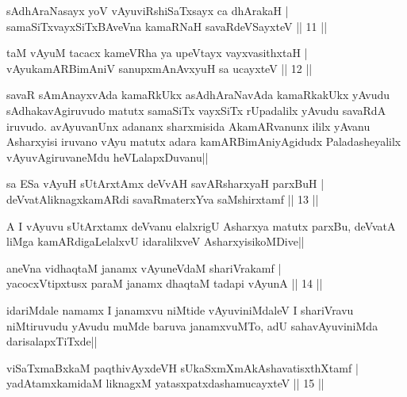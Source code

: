 \begin{shl}
sAdhAraNasayx yoV vAyuviRshiSaTxsayx ca dhArakaH |\\
samaSiTxvayxSiTxBAveVna kamaRNaH savaRdeVSayxteV \hfill || 11 ||
\end{shl}

\begin{shl}
taM vAyuM tacacx kameVRha ya upeVtayx vayxvasithxtaH |\\
vAyukamARBimAniV sanupxmAnAvxyuH sa ucayxteV \hfill || 12 ||
\end{shl}

\begin{artha}
\stext savaR sAmAnayxvAda kamaRkUkx asAdhAraNavAda kamaRkakUkx yAvudu sAdhakavAgiruvudo matutx samaSiTx vayxSiTx rUpadalilx yAvudu savaRdA iruvudo. avAyuvanUnx adananx sharxmisida AkamARvanunx ililx yAvanu Asharxyisi iruvano vAyu matutx adara kamARBimAniyAgidudx Paladasheyalilx vAyuvAgiruvaneMdu heVLalapxDuvanu||
\end{artha}


\begin{shl}
sa ESa vAyuH sUtArxtAmx deVvAH savARsharxyaH parxBuH |\\
deVvatAliknagxkamARdi savaRmaterxYva saMshirxtamf \hfill || 13 ||
\end{shl}

\begin{artha}
A I vAyuvu sUtArxtamx deVvanu elalxrigU Asharxya matutx parxBu, deVvatA liMga kamARdigaLelalxvU idaralilxveV AsharxyisikoMDive||
\end{artha}


\begin{shl}
aneVna vidhaqtaM janamx vAyuneVdaM shariVrakamf |\\
yacocxVtipxtusx paraM janamx dhaqtaM tadapi vAyunA \hfill || 14 ||
\end{shl}

\begin{artha}
idariMdale namamx I janamxvu niMtide vAyuviniMdaleV I shariVravu niMtiruvudu yAvudu muMde baruva janamxvuMTo, adU sahavAyuviniMda darisalapxTiTxde||
\end{artha}

\begin{shl}
viSaTxmaBxkaM paqthivAyxdeVH sUkaSxmXmAkAshavatisxthXtamf |\\
yadAtamxkamidaM liknagxM yatasxpatxdashamucayxteV \hfill || 15 ||
\end{shl}

